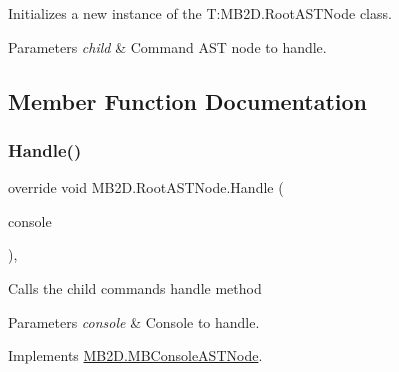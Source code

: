 Initializes a new instance of the T\+:\+M\+B2\+D.\+Root\+A\+S\+T\+Node class. 


\begin{DoxyParams}{Parameters}
{\em child} & Command A\+ST node to handle.\\
\hline
\end{DoxyParams}


\subsection{Member Function Documentation}
\hypertarget{class_m_b2_d_1_1_root_a_s_t_node_a16290285c34db0660c0a8006fa182d0d}{}\label{class_m_b2_d_1_1_root_a_s_t_node_a16290285c34db0660c0a8006fa182d0d} 
\subsubsection{\texorpdfstring{Handle()}{Handle()}}
{\footnotesize\ttfamily override void M\+B2\+D.\+Root\+A\+S\+T\+Node.\+Handle (\begin{DoxyParamCaption}\item[{\hyperlink{class_m_b2_d_1_1_m_b_console}{M\+B\+Console}}]{console }\end{DoxyParamCaption})\hspace{0.3cm}{\ttfamily [inline]}, {\ttfamily [virtual]}}



Calls the child commands handle method 


\begin{DoxyParams}{Parameters}
{\em console} & Console to handle.\\
\hline
\end{DoxyParams}


Implements \hyperlink{class_m_b2_d_1_1_m_b_console_a_s_t_node_aa70a49e61ab623698af4ed8fda4ebbf5}{M\+B2\+D.\+M\+B\+Console\+A\+S\+T\+Node}.

